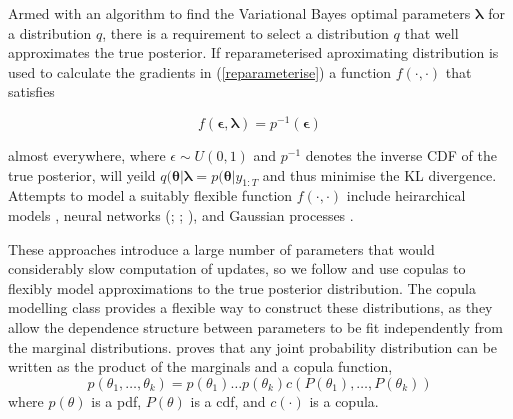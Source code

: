 \documentclass[12pt,a4paper]{article}%
\numberwithin{equation}{section}
\begin{document}
Armed with an algorithm to find the Variational Bayes optimal parameters $\boldsymbol{\lambda}$ for a distribution $q$, there is a requirement to select a distribution $q$ that well approximates the true posterior. If reparameterised aproximating distribution is used to calculate the gradients in (\ref{reparameterise}) a function $f(\cdot, \cdot)$ that satisfies 

\begin{equation}
\label{optimalf}
f(\boldsymbol{\epsilon}, \boldsymbol{\lambda}) = p^{-1}(\boldsymbol{\epsilon})
\end{equation}

almost everywhere, where $\epsilon \sim U(0, 1)$ and $p^{-1}$ denotes the inverse CDF of the true posterior, will yeild $q(\boldsymbol{\theta} | \boldsymbol{\lambda} = p(\boldsymbol{\theta} | y_{1:T}$ and thus minimise the KL divergence. Attempts to model a suitably flexible function $f(\cdot, \cdot)$ include heirarchical models \citep{Ranganath2016a}, neural networks (\citealp{Kingma2014}; \citealp{Rezende2014}; \citealp{Rezende2015}), and Gaussian processes \citep{Tran2016}.

These approaches introduce a large number of parameters that would considerably slow computation of updates, so we follow \citet{Tran2015} and use copulas to flexibly model approximations to the true posterior distribution. The copula modelling class provides a flexible way to construct these distributions, as they allow the dependence structure between parameters to be fit independently from the marginal distributions. \citet{Sklar1959} proves that any joint probability distribution can be written as the product of the marginals and a copula function,
\begin{equation}
\label{vc1}
p(\theta_1, \dots, \theta_k) = p(\theta_1) \dots p(\theta_k) c(P(\theta_1), \dots, P(\theta_k))
\end{equation}
where $p(\theta)$ is a pdf, $P(\theta)$ is a cdf, and $c(\cdot)$ is a copula. 
\end{document}

